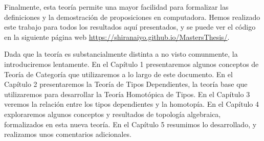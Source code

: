 \documentclass[../main.tex]{subfiles}
\begin{document}
Finalmente, esta teor\'ia permite una mayor facilidad para formalizar las definiciones y la demostraci\'on de proposiciones en computadora.
Hemos realizado este trabajo para todos los resultados aqu\'i presentados, y se puede ver el c\'odigo en la siguiente p\'agina web \url{https://shiranaiyo.github.io/MastersThesis/}.

Dada que la teor\'ia es substancialmente distinta a no visto comunmente, la introduciremos lentamente.
En el Cap\'itulo 1 presentaremos algunos conceptos de Teor\'ia de Categor\'ia que utilizaremos a lo largo de este documento. En el Cap\'itulo 2 presentaremos la Teor\'ia de Tipos Dependientes, la teor\'ia base que utilizaremos para desarrollar la Teor\'ia Homot\'opica de Tipos. En el Cap\'itulo 3 veremos la relación entre los tipos dependientes y la homotop\'ia. En el Cap\'itulo 4 exploraremos algunos conceptos y resultados de topolog\'ia algebraica, formalizados en esta nueva teor\'ia.
En el Cap\'itulo 5 resumimos lo desarrollado, y realizamos unos comentarios adicionales.
\end{document}
